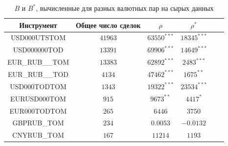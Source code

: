 \begin{appendices}
        \begin{table}[h!]
                \begin{center}
                    \begin{tabular}{|c|c|c|c|c|c|}
                        \hline
                    Инструмент       & Общее число сделок & $\rho$ & $\rho ^*$ \\ \hline
                    USD000UTSTOM     & $41963$ & $63550^{***}$ & $18345^{***}$ \\ \hline
                    USD000000TOD     & $13391$ & $69906^{***}$ & $14649^{***}$ \\ \hline
                    EUR\_RUB\_\_TOM  & $13383$ & $62892^{***}$ & $2483^{***} $ \\ \hline
                    EUR\_RUB\_\_TOD  & $4134 $ & $47462^{***}$ & $1675^{**}  $ \\ \hline
                    USD000TODTOM     & $1343 $ & $19322^{***}$ & $23534^{***}$ \\ \hline
                    EURUSD000TOM     & $915  $ & $9673^{**}  $ & $4417^{*}   $ \\ \hline
                    EUR000TODTOM     & $265  $ & $6446       $ & $3750       $ \\ \hline
                    GBPRUB\_TOM      & $234  $ & $0.0053     $ & $-0.0132    $ \\ \hline
                    CNYRUB\_TOM      & $167  $ & $11214      $ & $1193       $ \\ \hline
                    \end{tabular}
                \end{center}
                \label{tableanalrdcu}
                \caption{$B$ и $B ^*$, вычисленные для разных валютных пар на сырых данных}
            \end{table} 
            

\end{appendices}
